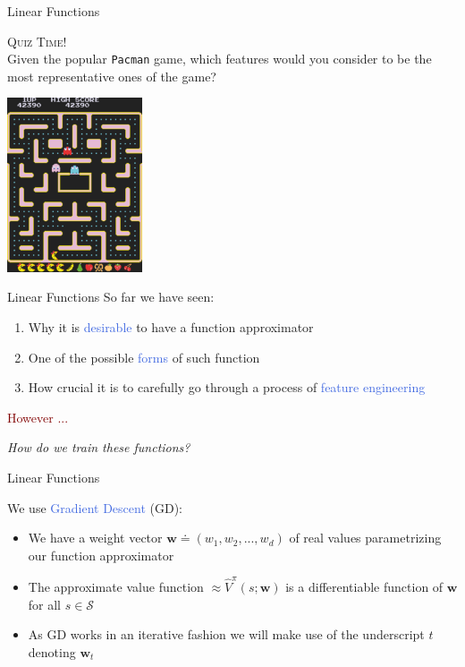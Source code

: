 \documentclass{beamer}
\newenvironment{takeaway}[1]{%
	\definecolor{shadecolor}{gray}{0.9}%
		\begin{shaded}{\color{skymagenta}\noindent\textsc{#1}}\\%
		}{%
		\end{shaded}%
}
\begin{document}
\begin{frame}{Linear Functions}
	\begin{takeaway}{Quiz Time!}
		Given the popular \texttt{Pacman} game, which features would you consider to be the most representative ones of the game?
	
	\end{takeaway}
	\begin{center}
		\includegraphics[width=4cm]{./Images/p}
	\end{center}

\end{frame}

\begin{frame}{Linear Functions}
	So far we have seen:
	\begin{enumerate}
		\item Why it is \textcolor{RoyalBlue}{desirable} to have a function approximator
		\item One of the possible \textcolor{RoyalBlue}{forms} of such function 
		\item How crucial it is to carefully go through a process of \textcolor{RoyalBlue}{feature engineering} 
	\end{enumerate}
	\bigskip

	\centering

	\textcolor{Maroon}{However ...}

	\bigskip
	\textit{How do we train these functions?}

\end{frame}

\begin{frame}{Linear Functions}
	\begin{center}
		We use \textcolor{RoyalBlue}{Gradient Descent} (GD):
	\end{center}
	
	\bigskip

	\begin{itemize}
		\item We have a weight vector $\mathbf{w}\doteq(w_1, w_2, ..., w_d)$ of real values parametrizing our function approximator
		\item The approximate value function $\approx \hat{V}^{\pi}(s;\mathbf{w})$ is a differentiable function of $\mathbf{w}$ for all $s\in\mathcal{S}$
		\item As GD works in an iterative fashion we will make use of the underscript $t$ denoting $\mathbf{w}_t$
	\end{itemize}
\end{frame}
\end{document}
